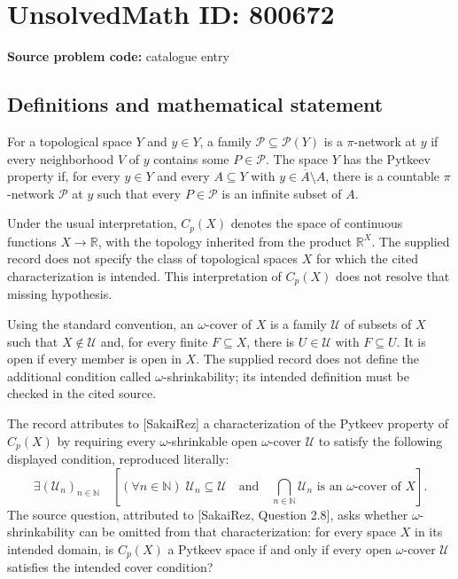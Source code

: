 \documentclass[11pt]{article}
\newcommand{\N}{\mathbb{N}}
\newcommand{\R}{\mathbb{R}}
\begin{document}
\section*{UnsolvedMath ID: 800672}
\textbf{Source problem code:} catalogue entry
\subsection{Definitions and mathematical statement}
For a topological space \(Y\) and \(y\in Y\), a family \(\mathcal P\subseteq\mathcal P(Y)\) is a \(\pi\)-network at \(y\) if every neighborhood \(V\) of \(y\) contains some \(P\in\mathcal P\). The space \(Y\) has the Pytkeev property if, for every \(y\in Y\) and every \(A\subseteq Y\) with \(y\in\overline A\setminus A\), there is a countable \(\pi\)-network \(\mathcal P\) at \(y\) such that every \(P\in\mathcal P\) is an infinite subset of \(A\).

Under the usual interpretation, \(C_p(X)\) denotes the space of continuous functions \(X\to\R\), with the topology inherited from the product \(\R^X\). The supplied record does not specify the class of topological spaces \(X\) for which the cited characterization is intended. This interpretation of \(C_p(X)\) does not resolve that missing hypothesis.

Using the standard convention, an \(\omega\)-cover of \(X\) is a family \(\mathcal U\) of subsets of \(X\) such that \(X\notin\mathcal U\) and, for every finite \(F\subseteq X\), there is \(U\in\mathcal U\) with \(F\subseteq U\). It is open if every member is open in \(X\). The supplied record does not define the additional condition called \(\omega\)-shrinkability; its intended definition must be checked in the cited source.

The record attributes to [SakaiRez] a characterization of the Pytkeev property of \(C_p(X)\) by requiring every \(\omega\)-shrinkable open \(\omega\)-cover \(\mathcal U\) to satisfy the following displayed condition, reproduced literally:
\[
\exists (\mathcal U_n)_{n\in\N}\quad
\left[
 (\forall n\in\N)\;\mathcal U_n\subseteq\mathcal U
 \quad\text{and}\quad
 \bigcap_{n\in\N}\mathcal U_n
 \text{ is an }\omega\text{-cover of }X
\right]. \tag{*}
\]
The source question, attributed to [SakaiRez, Question 2.8], asks whether \(\omega\)-shrinkability can be omitted from that characterization: for every space \(X\) in its intended domain, is \(C_p(X)\) a Pytkeev space if and only if every open \(\omega\)-cover \(\mathcal U\) satisfies the intended cover condition?
\end{document}
